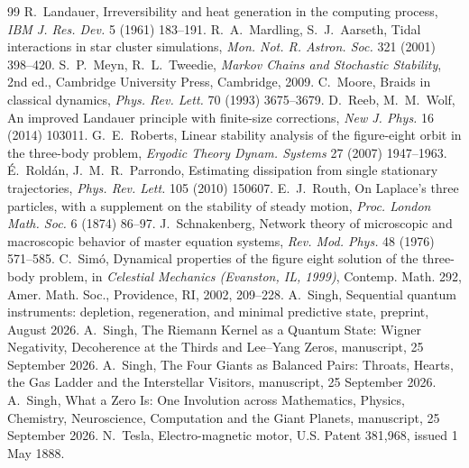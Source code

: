\documentclass[11pt]{article}
\theoremstyle{definition}\newtheorem{definition}[theorem]{Definition}
\theoremstyle{remark}\newtheorem{remark}[theorem]{Remark}
\begin{document}
\begin{thebibliography}{99}
 R.~Landauer, Irreversibility and heat generation in the computing process, \emph{IBM J. Res. Dev.} 5 (1961) 183--191.
 R.~A.~Mardling, S.~J.~Aarseth, Tidal interactions in star cluster simulations, \emph{Mon. Not. R. Astron. Soc.} 321 (2001) 398--420.
 S.~P.~Meyn, R.~L.~Tweedie, \emph{Markov Chains and Stochastic Stability}, 2nd ed., Cambridge University Press, Cambridge, 2009.
 C.~Moore, Braids in classical dynamics, \emph{Phys. Rev. Lett.} 70 (1993) 3675--3679.
 D.~Reeb, M.~M.~Wolf, An improved Landauer principle with finite-size corrections, \emph{New J. Phys.} 16 (2014) 103011.
 G.~E.~Roberts, Linear stability analysis of the figure-eight orbit in the three-body problem, \emph{Ergodic Theory Dynam. Systems} 27 (2007) 1947--1963.
 \'E.~Rold\'an, J.~M.~R.~Parrondo, Estimating dissipation from single stationary trajectories, \emph{Phys. Rev. Lett.} 105 (2010) 150607.
 E.~J.~Routh, On Laplace's three particles, with a supplement on the stability of steady motion, \emph{Proc. London Math. Soc.} 6 (1874) 86--97.
 J.~Schnakenberg, Network theory of microscopic and macroscopic behavior of master equation systems, \emph{Rev. Mod. Phys.} 48 (1976) 571--585.
 C.~Sim\'o, Dynamical properties of the figure eight solution of the three-body problem, in \emph{Celestial Mechanics (Evanston, IL, 1999)}, Contemp. Math. 292, Amer. Math. Soc., Providence, RI, 2002, 209--228.
 A.~Singh, Sequential quantum instruments: depletion, regeneration, and minimal predictive state, preprint, August 2026.
 A.~Singh, The Riemann Kernel as a Quantum State: Wigner Negativity, Decoherence at the Thirds and Lee--Yang Zeros, manuscript, 25 September 2026.
 A.~Singh, The Four Giants as Balanced Pairs: Throats, Hearts, the Gas Ladder and the Interstellar Visitors, manuscript, 25 September 2026.
 A.~Singh, What a Zero Is: One Involution across Mathematics, Physics, Chemistry, Neuroscience, Computation and the Giant Planets, manuscript, 25 September 2026.
 N.~Tesla, Electro-magnetic motor, U.S. Patent 381,968, issued 1 May 1888.
\end{thebibliography}
\end{document}
